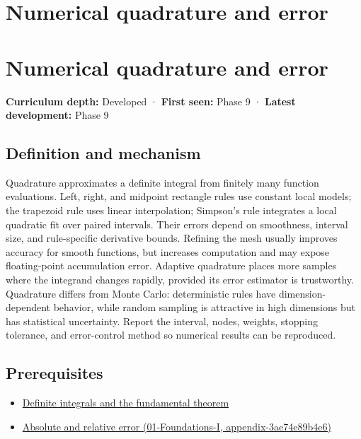 \hypertarget{appendix-80521eae6b71}{}
\section*{Numerical quadrature and error}
\section{Numerical quadrature and error}\label{appendix-80521eae6b71-numerical-quadrature-and-error}

\textbf{Curriculum depth:} Developed · \textbf{First seen:} Phase 9 · \textbf{Latest development:} Phase 9

\subsection{Definition and mechanism}\label{appendix-80521eae6b71-definition-and-mechanism}

Quadrature approximates a definite integral from finitely many function evaluations. Left, right, and midpoint rectangle rules use constant local models; the trapezoid rule uses linear interpolation; Simpson's rule integrates a local quadratic fit over paired intervals. Their errors depend on smoothness, interval size, and rule-specific derivative bounds. Refining the mesh usually improves accuracy for smooth functions, but increases computation and may expose floating-point accumulation error. Adaptive quadrature places more samples where the integrand changes rapidly, provided its error estimator is trustworthy. Quadrature differs from Monte Carlo: deterministic rules have dimension-dependent behavior, while random sampling is attractive in high dimensions but has statistical uncertainty. Report the interval, nodes, weights, stopping tolerance, and error-control method so numerical results can be reproduced.

\subsection{Prerequisites}\label{appendix-80521eae6b71-prerequisites}

\begin{itemize}
\tightlist
\item
  \hyperref[appendix-1a50e72435c2]{Definite integrals and the fundamental theorem}
\item
  \href{../01-Foundations-I/main.pdf\#nameddest=appendix-3ae74e89b4e6}{Absolute and relative error (01-Foundations-I, appendix-3ae74e89b4e6)}
\end{itemize}

